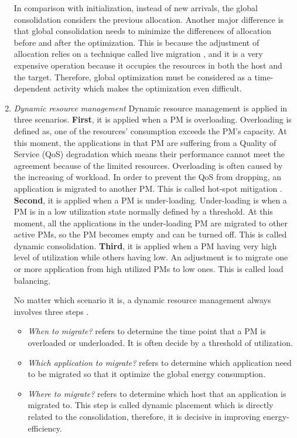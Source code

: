 \begin{enumerate}
	In comparison with initialization, instead of new arrivals, the global consolidation considers the previous allocation. Another major difference is that global consolidation needs to minimize the differences of allocation before and after the optimization. This is because the adjustment of allocation relies on a technique called live migration \cite{Clark:2005uda}, and it is a very expensive operation because it occupies the resources in both the host and the target. Therefore, global optimization must be considered as a time-dependent activity which makes the optimization even difficult.

	\item \emph{Dynamic resource management} 
 	Dynamic resource management is applied in three scenarios. \textbf{First},  it is applied when a PM is overloading. Overloading is defined as, one of the resources' consumption exceeds the PM's capacity. At this moment, the applications in that PM are suffering from a Quality of Service (QoS) degradation which means their performance cannot meet the agreement because of the limited resources. Overloading is often caused by the increasing of workload. In order to prevent the QoS from dropping, an application is migrated to another PM. This is called hot-spot mitigation \cite{Mishra:2012kx}. \textbf{Second}, it is applied when a PM is under-loading. Under-loading is when a PM is in a low utilization state normally defined by a threshold. At this moment, all the applications in the under-loading PM are migrated to other active PMs, so the PM becomes empty and can be turned off. This is called dynamic consolidation. \textbf{Third}, it is applied when a PM having very high level of utilization while others having low. An adjustment is to migrate one or more application from high utilized PMs to low ones. This is called load balancing.

	No matter which scenario it is, a dynamic resource management always involves three steps . 
	\begin{itemize}
		\item \emph{When to migrate?} refers to determine the time point that a PM is overloaded or underloaded. It is often decide by a threshold of utilization.
		\item \emph{Which application to migrate?} refers to determine which application need to be migrated so that it optimize the global energy consumption.
		\item \emph{Where to migrate?} refers to determine which host that an application is migrated to. This step is called dynamic placement which is directly related to the consolidation, therefore, it is decisive in improving energy-efficiency. 
	\end{itemize}


\end{enumerate}
